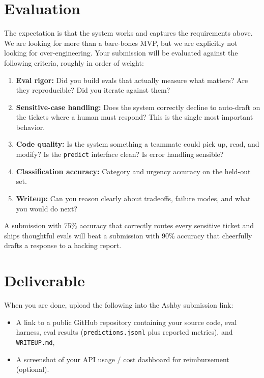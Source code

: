 \documentclass[11pt]{article}
\begin{document}
\section{Evaluation}
The expectation is that the system works and captures the requirements above. We are looking for more than a bare-bones MVP, but we are explicitly not looking for over-engineering. Your submission will be evaluated against the following criteria, roughly in order of weight:
\begin{enumerate}[noitemsep]
    \item \textbf{Eval rigor:} Did you build evals that actually measure what matters? Are they reproducible? Did you iterate against them?
    \item \textbf{Sensitive-case handling:} Does the system correctly decline to auto-draft on the tickets where a human must respond? This is the single most important behavior.
    \item \textbf{Code quality:} Is the system something a teammate could pick up, read, and modify? Is the \texttt{predict} interface clean? Is error handling sensible?
    \item \textbf{Classification accuracy:} Category and urgency accuracy on the held-out set.
    \item \textbf{Writeup:} Can you reason clearly about tradeoffs, failure modes, and what you would do next?
\end{enumerate}
A submission with 75\% accuracy that correctly routes every sensitive ticket and ships thoughtful evals will beat a submission with 90\% accuracy that cheerfully drafts a response to a hacking report.

\section{Deliverable}
When you are done, upload the following into the Ashby submission link:
\begin{itemize}[noitemsep]
    \item A link to a public GitHub repository containing your source code, eval harness, eval results (\texttt{predictions.jsonl} plus reported metrics), and \texttt{WRITEUP.md},
    \item A screenshot of your API usage / cost dashboard for reimbursement (optional).
\end{itemize}
\end{document}
